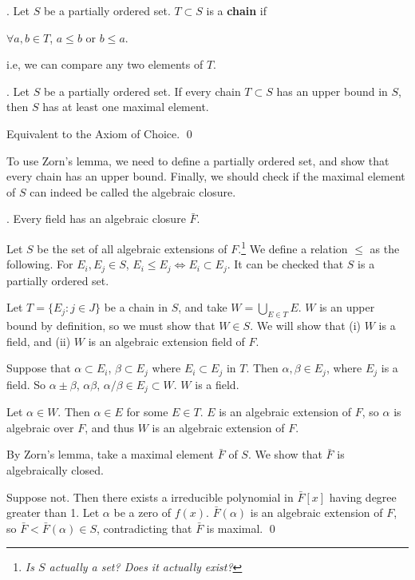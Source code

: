 .  Let \(S\) be a partially ordered set. \(T \subset S\) is a \textbf{chain} if
\begin{center}
    \(\forall a, b \in T\), \(a \leq b\) or \(b \leq a\).
\end{center}
i.e, we can compare any two elements of \(T\).

\lemma.  Let \(S\) be a partially ordered set. If every chain \(T \subset S\) has an upper bound in \(S\), then \(S\) has at least one maximal element.

\pf Equivalent to the Axiom of Choice. \qed

To use Zorn's lemma, we need to define a partially ordered set, and show that every chain has an upper bound. Finally, we should check if the maximal element of \(S\) can indeed be called the algebraic closure.

\thm. Every field has an algebraic closure \(\bar{F}\).

\pf Let \(S\) be the set of all algebraic extensions of \(F\).\footnote{\textit{Is \(S\) actually a set? Does it actually exist?}} We define a relation \(\leq\) as the following. For \(E_i, E_j \in S\), \(E_i \leq E_j \iff E_i \subset E_j\). It can be checked that \(S\) is a partially ordered set.

Let \(T = \{E_j : j \in J\}\) be a chain in \(S\), and take \(W = \bigcup_{E \in T} E\). \(W\) is an upper bound by definition, so we must show that \(W \in S\). We will show that (i) \(W\) is a field, and (ii) \(W\) is an algebraic extension field of \(F\).

 Suppose that \(\alpha \subset E_i\), \(\beta \subset E_j\) where \(E_i \subset E_j\) in \(T\). Then \(\alpha, \beta \in E_j\), where \(E_j\) is a field. So \(\alpha \pm \beta\), \(\alpha\beta\), \(\alpha / \beta \in E_j \subset W\). \(W\) is a field.

 Let \(\alpha \in W\). Then \(\alpha \in E\) for some \(E \in T\). \(E\) is an algebraic extension of \(F\), so \(\alpha\) is algebraic over \(F\), and thus \(W\) is an algebraic extension of \(F\).

By Zorn's lemma, take a maximal element \(\bar{F}\) of \(S\). We show that \(\bar{F}\) is algebraically closed.

Suppose not. Then there exists a irreducible polynomial in \(\bar{F}[x]\) having degree greater than 1. Let \(\alpha\) be a zero of \(f(x)\). \(\bar{F}(\alpha)\) is an algebraic extension of \(F\), so \(\bar{F} < \bar{F}(\alpha) \in S\), contradicting that \(\bar{F}\) is maximal. \qed

